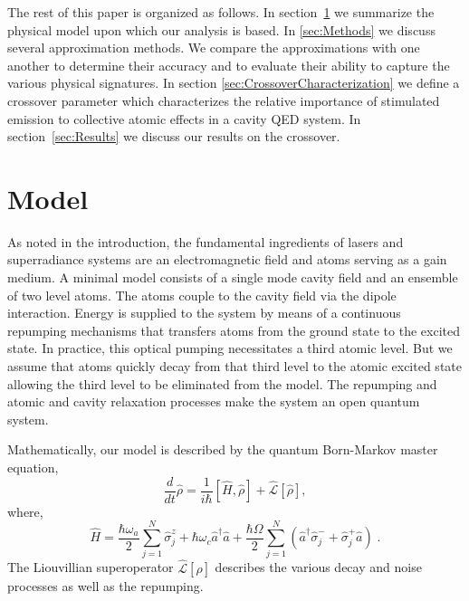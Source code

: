 \documentclass[aps,
twocolumn,
showpacs,
superscriptaddress,groupedaddress]{revtex4}
\begin{document}
The rest of this paper is organized as follows.  In
section~\ref{sec:Model} we summarize the physical model upon which our
analysis is based. In \ref{sec:Methods} we discuss several approximation
methods.  We compare the approximations with one another to determine
their accuracy and to evaluate their ability to capture the various
physical signatures. In section \ref{sec:CrossoverCharacterization} we
define a crossover parameter which characterizes the relative importance
of stimulated emission to collective atomic effects in a cavity QED
system.  In section~\ref{sec:Results} we discuss our results on the
crossover.


\section{Model}
\label{sec:Model}

As noted in the introduction, the fundamental ingredients of lasers and
superradiance systems are an electromagnetic field and atoms serving as
a gain medium.  A minimal model consists of a single mode cavity field
and an ensemble of two level atoms.  The atoms couple to the
cavity field via the dipole interaction.  Energy is supplied to the
system by means of a continuous repumping mechanisms that transfers
atoms from the ground state to the excited state.  In practice, this
optical pumping necessitates a third atomic level.  But we assume that
atoms quickly decay from that third level to the atomic excited state
allowing the third level to be eliminated from the model.  The
repumping and atomic and cavity relaxation processes make the system an
open quantum system.

Mathematically, our model is described by the quantum Born-Markov master
equation,
\begin{equation}
  \frac{d}{dt} \hat{\rho} =
  \frac{1}{i \hbar} \left[ \hat{H}, \hat{\rho} \right] +
  \hat{\mathcal{L}}\left[ \hat{\rho} \right],
\label{ME1Crossover}
\end{equation}
where,
\begin{equation}
\hat{H} = \frac{\hbar \omega_a}{2} \sum_{j=1}^{N} \hat{\sigma}^{z}_{j}
+ \hbar \omega_c \hat{a}^{\dagger}\hat{a}
+ \frac{\hbar \Omega}{2}  \sum_{j=1}^{N} \left(
    \hat{a}^{\dagger} \hat{\sigma}^{-}_{j} +
    \hat{\sigma}^{+}_{j} \hat{a} \right)\;.
\end{equation}
The Liouvillian superoperator $\hat{\mathcal{L}}\left[ \hat{\rho}
\right]$ describes the various decay and noise processes as well as the
repumping.
\end{document}
